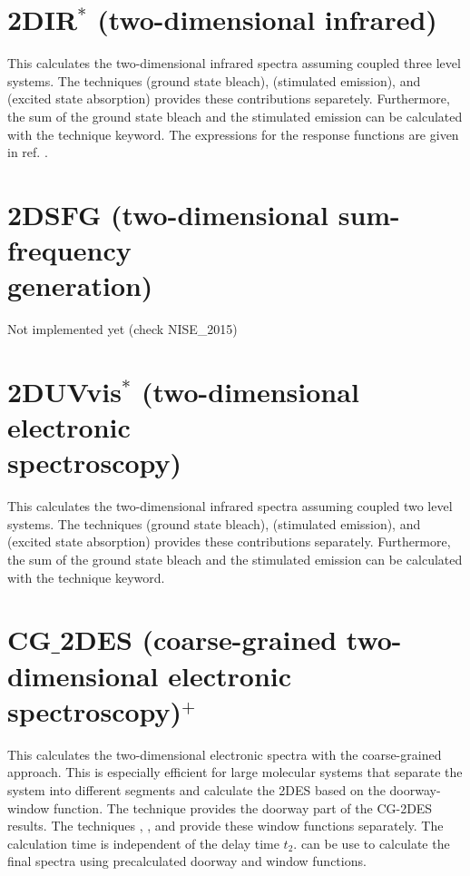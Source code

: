 \section{2DIR$^{*}$ (two-dimensional infrared)}
This calculates the two-dimensional infrared spectra assuming coupled three level systems.
The techniques  (ground state bleach),  (stimulated emission), and  (excited state absorption) provides these contributions separetely.
Furthermore, the sum of the ground state bleach and the stimulated emission can be calculated with the  technique keyword.
The expressions for the response functions are given in ref. \cite{Jansen.2006.JPCB.110.22910}.

\section{2DSFG (two-dimensional sum-frequency\\ generation)}
Not implemented yet (check NISE\_2015)
 
\section{2DUVvis$^{*}$ (two-dimensional electronic\\ spectroscopy)}
This calculates the two-dimensional infrared spectra assuming coupled two level systems.
The techniques  (ground state bleach),  (stimulated emission), and  (excited state absorption) provides these contributions separately.
Furthermore, the sum of the ground state bleach and the stimulated emission can be calculated with the  technique keyword. 

\section{CG$\_$2DES (coarse-grained two-dimensional electronic spectroscopy)$^{+}$}
This calculates the two-dimensional electronic spectra with the coarse-grained approach.\cite{Zhong.2024.J.Chem.TheoryComput..20.6111}
This is especially efficient for large molecular systems that separate the system into different segments and calculate the 2DES based
on the doorway-window function.
The technique  provides the doorway part of the CG-2DES results.
The techniques , , and  provide these
window functions separately. The calculation time is independent of the delay time $t_2$.
 can be use to calculate the final spectra using precalculated doorway and window functions.

